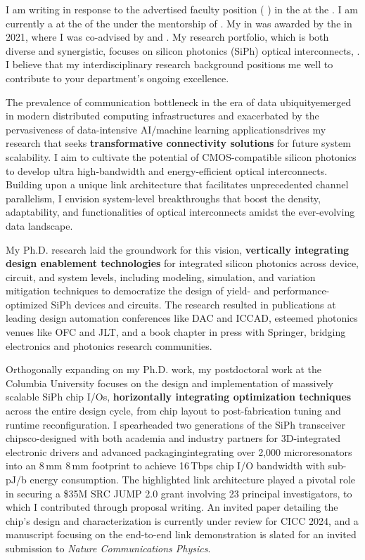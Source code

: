 I am writing in response to the advertised faculty position (\textbf{\appPosition{} \appJobID}) in the \appDept{} at the \appSchool{}. I am currently a \myTitle{} at the \myDept{} of the \mySchoolShort{} under the mentorship of \mySuper{}. My \myDegree{} in \myMajor{} was awarded by the \myPhDSchool{} in 2021, where I was co-advised by \myAdvisor{} and \myCoAdvisor{}. My research portfolio, which is both diverse and synergistic, focuses on silicon photonics (SiPh) optical interconnects, \appSpecific{}. I believe that my interdisciplinary research background positions me well to contribute to your department's ongoing excellence.

The prevalence of communication bottleneck in the era of data ubiquity\textemdash emerged in modern distributed computing infrastructures and exacerbated by the pervasiveness of data-intensive AI/machine learning applications\textemdash drives my research that seeks \textbf{transformative connectivity solutions} for future system scalability. I aim to cultivate the potential of CMOS-compatible silicon photonics to develop ultra high-bandwidth and energy-efficient optical interconnects. Building upon a unique link architecture that facilitates unprecedented channel parallelism, I envision system-level breakthroughs that boost the density, adaptability, and functionalities of optical interconnects amidst the ever-evolving data landscape.

My Ph.D. research laid the groundwork for this vision, \textbf{vertically integrating design enablement technologies} for integrated silicon photonics across device, circuit, and system levels, including modeling, simulation, and variation mitigation techniques to democratize the design of yield- and performance-optimized SiPh devices and circuits. The research resulted in publications at leading design automation conferences like DAC and ICCAD, esteemed photonics venues like OFC and JLT, and a book chapter in press with Springer, bridging electronics and photonics research communities.

Orthogonally expanding on my Ph.D. work, my postdoctoral work at the Columbia University focuses on the design and implementation of massively scalable SiPh chip I/Os, \textbf{horizontally integrating optimization techniques} across the entire design cycle, from chip layout to post-fabrication tuning and runtime reconfiguration. I spearheaded two generations of the SiPh transceiver chips\textemdash co-designed with both academia and industry partners for 3D-integrated electronic drivers and advanced packaging\textemdash integrating over 2,000 microresonators into an 8\,mm \texttimes{} 8\,mm footprint to achieve 16\,Tbps chip I/O bandwidth with sub-pJ/b energy consumption. The highlighted link architecture played a pivotal role in securing a \$35M SRC JUMP 2.0 grant involving 23 principal investigators, to which I contributed through proposal writing. An invited paper detailing the chip's design and characterization is currently under review for CICC 2024, and a manuscript focusing on the end-to-end link demonstration is slated for an invited submission to \emph{Nature Communications Physics}.

